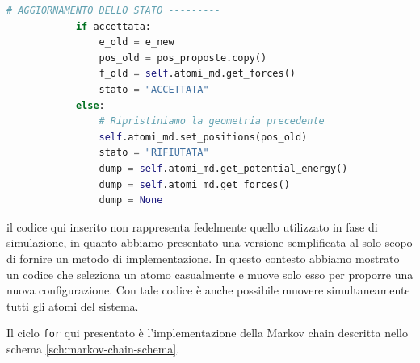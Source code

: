 \begin{lstlisting}[caption={Snippet per la classe che implementa l'algoritmo di Metropolis}, label={code:zbl-class-implementation}, language=python]
            # AGGIORNAMENTO DELLO STATO ---------
            if accettata:
                e_old = e_new
                pos_old = pos_proposte.copy()
                f_old = self.atomi_md.get_forces()
                stato = "ACCETTATA"
            else:
                # Ripristiniamo la geometria precedente
                self.atomi_md.set_positions(pos_old)
                stato = "RIFIUTATA"                
                dump = self.atomi_md.get_potential_energy()
                dump = self.atomi_md.get_forces()
                dump = None

\end{lstlisting}

il codice qui inserito non rappresenta fedelmente quello utilizzato in fase di simulazione, in quanto abbiamo presentato una versione semplificata al solo scopo di fornire un metodo di implementazione. In questo contesto abbiamo mostrato un codice che seleziona un atomo casualmente e muove solo esso per proporre una nuova configurazione. Con tale codice è anche possibile muovere simultaneamente tutti gli atomi del sistema.

Il ciclo \texttt{for} qui presentato è l'implementazione della Markov chain descritta nello schema \ref{sch:markov-chain-schema}.